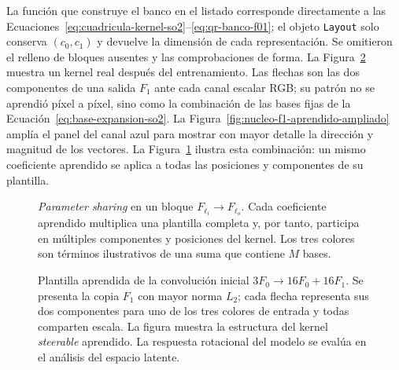 La función que construye el banco en el listado corresponde directamente a las
Ecuaciones~\eqref{eq:cuadricula-kernel-so2}--\eqref{eq:qr-banco-f01}; el
objeto \texttt{Layout} solo conserva \((c_0,c_1)\) y devuelve la dimensión de
cada representación. Se omitieron el relleno de bloques ausentes y las
comprobaciones de forma. La Figura~\ref{fig:nucleo-f1-aprendido}
muestra un kernel real después del entrenamiento. Las flechas son las dos
componentes de una salida \(F_1\) ante cada canal escalar RGB; su patrón no se
aprendió píxel a píxel, sino como la combinación de las bases fijas de la
Ecuación~\eqref{eq:base-expansion-so2}.
La Figura~\ref{fig:nucleo-f1-aprendido-ampliado} amplía el panel del canal azul
para mostrar con mayor detalle la dirección y magnitud de los vectores.
La Figura~\ref{fig:comparticion-parametros-kernel} ilustra esta combinación:
un mismo coeficiente aprendido se aplica a todas las posiciones y componentes
de su plantilla.

\begin{figure}[htbp]
    \centering
    \resizebox{\textwidth}{!}{}
    \caption{\emph{Parameter sharing} en un bloque
    \(F_{\ell_i}\!\to F_{\ell_o}\). Cada coeficiente aprendido multiplica una
    plantilla completa y, por tanto, participa en múltiples componentes y
    posiciones del kernel. Los tres colores son términos ilustrativos de una
    suma que contiene \(M\) bases.}
    \label{fig:comparticion-parametros-kernel}
\end{figure}

\begin{figure}[htbp]
    \centering
    \begin{minipage}{0.94\textwidth}
        \centering
        
    \end{minipage}
    \caption{Plantilla aprendida de la convolución inicial
    \(3F_0\to16F_0+16F_1\). Se presenta la copia \(F_1\) con mayor norma
    \(L_2\); cada flecha representa sus dos componentes para uno de los tres
    colores de entrada y todas comparten escala. La figura muestra la
    estructura del kernel \emph{steerable} aprendido. La respuesta rotacional del
    modelo se evalúa en el análisis del espacio latente.}
    \label{fig:nucleo-f1-aprendido}
\end{figure}

